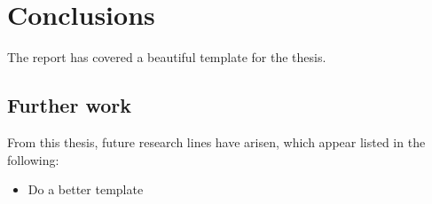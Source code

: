 \chapter{Conclusions} 
The report has covered a beautiful template for the thesis. 


\section{Further work}
From this thesis, future research lines have arisen, which appear listed in the following:
    \begin{itemize}
    \item Do a better template 
    \end{itemize}
